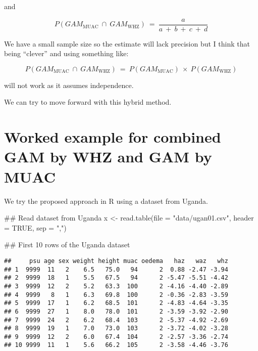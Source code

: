 \documentclass[12pt,a4paper]{article}
\newenvironment{Shaded}{}{}
\newcommand{\CommentTok}[1]{\textcolor[rgb]{0.00,0.50,0.00}{#1}}
\newcommand{\DataTypeTok}[1]{#1}
\newcommand{\KeywordTok}[1]{\textcolor[rgb]{0.00,0.00,1.00}{#1}}
\newcommand{\NormalTok}[1]{#1}
\newcommand{\OtherTok}[1]{\textcolor[rgb]{1.00,0.25,0.00}{#1}}
\newcommand{\StringTok}[1]{\textcolor[rgb]{0.00,0.50,0.50}{#1}}
\begin{document}
and

\[ P(GAM_{\text{MUAC}} ~ \cap ~ GAM_{\text{WHZ}}) ~ = ~ \frac{a}{a ~ + ~ b ~ + ~ c ~ + ~ d} \]

We have a small sample size so the estimate will lack precision but I think that being ``clever'' and using something like:

\[ P(GAM_{\text{MUAC}} ~ \cap ~ GAM_{\text{WHZ}}) ~ = ~ P(GAM_{\text{MUAC}}) ~ \times ~ P(GAM_{\text{WHZ}}) \]

will not work as it assumes independence.

We can try to move forward with this hybrid method.

\newpage

\hypertarget{worked-example-for-combined-gam-by-whz-and-gam-by-muac}{%
\section{Worked example for combined GAM by WHZ and GAM by MUAC}\label{worked-example-for-combined-gam-by-whz-and-gam-by-muac}}

We try the proposed approach in R using a dataset from Uganda.

\begin{Shaded}
\begin{Highlighting}[]
\CommentTok{## Read dataset from Uganda}
\NormalTok{x <-}\StringTok{ }\KeywordTok{read.table}\NormalTok{(}\DataTypeTok{file =} \StringTok{"data/ugan01.csv"}\NormalTok{, }\DataTypeTok{header =} \OtherTok{TRUE}\NormalTok{, }\DataTypeTok{sep =} \StringTok{","}\NormalTok{)}

\CommentTok{## First 10 rows of the Uganda dataset}
\end{Highlighting}
\end{Shaded}

\begin{verbatim}
##     psu age sex weight height muac oedema   haz   waz   whz
## 1  9999  11   2    6.5   75.0   94      2  0.88 -2.47 -3.94
## 2  9999  18   1    5.5   67.5   94      2 -5.47 -5.51 -4.42
## 3  9999  12   2    5.2   63.3  100      2 -4.16 -4.40 -2.89
## 4  9999   8   1    6.3   69.8  100      2 -0.36 -2.83 -3.59
## 5  9999  17   1    6.2   68.5  101      2 -4.83 -4.64 -3.35
## 6  9999  27   1    8.0   78.0  101      2 -3.59 -3.92 -2.90
## 7  9999  24   2    6.2   68.4  103      2 -5.37 -4.92 -2.69
## 8  9999  19   1    7.0   73.0  103      2 -3.72 -4.02 -3.28
## 9  9999  12   2    6.0   67.4  104      2 -2.57 -3.36 -2.74
## 10 9999  11   1    5.6   66.2  105      2 -3.58 -4.46 -3.76
\end{verbatim}
\end{document}
